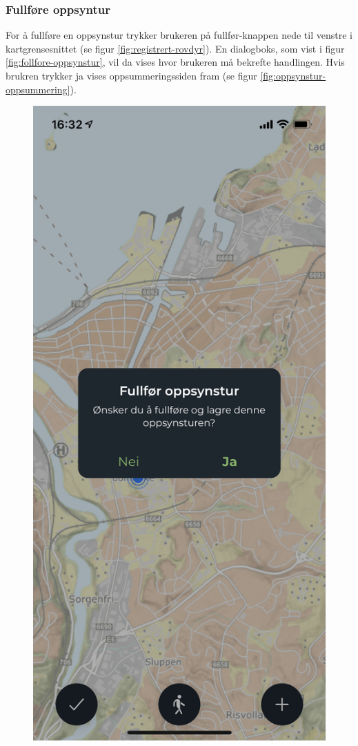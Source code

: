 \subsubsection{Fullføre oppsyntur}
For å fullføre en oppsynstur trykker brukeren på fullfør-knappen nede til venstre i kartgrensesnittet (se figur \ref{fig:registrert-rovdyr}). En dialogboks, som vist i figur \ref{fig:follfore-oppsynstur}, vil da vises hvor brukeren må bekrefte handlingen. Hvis brukren trykker ja vises oppsummeringssiden fram (se figur \ref{fig:oppsynstur-oppsummering}).

\begin{figure}[H]
  \centering
  \begin{minipage}[b]{0.4\textwidth}
    \centering
    \includegraphics[scale=0.4]{Figurer/skjermbilder/follfore-oppsynstur.png}

\end{minipage}
\end{figure}
